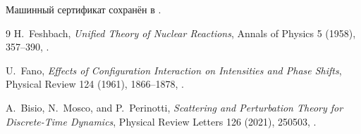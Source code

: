 Машинный сертификат сохранён в
.

\begin{thebibliography}{9}
H.~Feshbach,
\emph{Unified Theory of Nuclear Reactions},
Annals of Physics 5 (1958), 357--390,
.

U.~Fano,
\emph{Effects of Configuration Interaction on Intensities and Phase Shifts},
Physical Review 124 (1961), 1866--1878,
.

A.~Bisio, N.~Mosco, and P.~Perinotti,
\emph{Scattering and Perturbation Theory for Discrete-Time Dynamics},
Physical Review Letters 126 (2021), 250503,
.
\end{thebibliography}